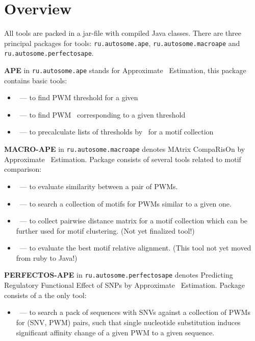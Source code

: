 \section{Overview}
All tools are packed in a jar-file with compiled Java classes. There are three principal packages for tools:
\texttt{ru.autosome.ape}, \texttt{ru.autosome.macroape} and \texttt{ru.autosome.perfectosape}.

\textbf{APE} in \texttt{ru.autosome.ape} stands for Approximate \pvalue\ Estimation, this package contains basic tools:
\begin{itemize}
\item {}~--- to find PWM threshold for a given \pvalue
\item {}~--- to find PWM \pvalue\ corresponding to a given threshold
\item {}~--- to precalculate lists of thresholds by \pvalues\ for a motif collection
\end{itemize}

\textbf{MACRO-APE} in \texttt{ru.autosome.macroape} denotes MAtrix CompaRisOn by Approximate \pvalue\ Estimation. Package consists of several tools related to motif comparison:
\begin{itemize}
\item {}~--- to evaluate similarity between a pair of PWMs.
\item {}~--- to search a collection of motifs for PWMs similar to a given one.
\item {}~--- to collect pairwise distance matrix for a motif collection which can be further used for motif clustering. (Not yet finalized tool!)
\item {}~--- to evaluate the best motif relative alignment. (This tool not yet moved from ruby to Java!)
\end{itemize}

\textbf{PERFECTOS-APE} in \texttt{ru.autosome.perfectosape} denotes Predicting Regulatory Functional Effect of SNPs by Approximate \pvalue\ Estimation. Package consists of a the only tool:
\begin{itemize}
\item{}~--- to search a pack of sequences with SNVs against a collection of PWMs for (SNV, PWM) pairs, such that single nucleotide substitution induces significant affinity change of a given PWM to a given sequence.
\end{itemize}
